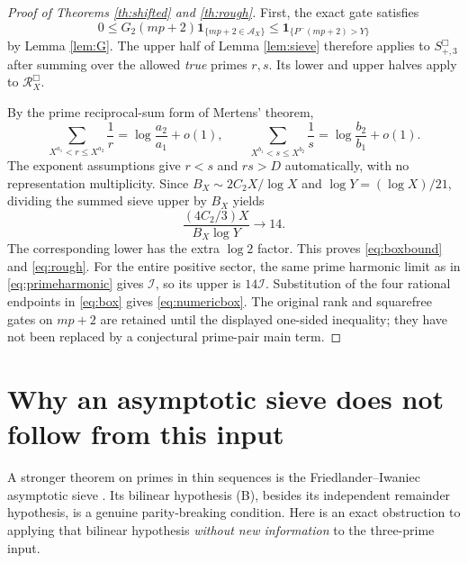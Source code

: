 \documentclass[11pt]{article}
\newcommand{\one}{\mathbf 1}
\newcommand{\aset}{\mathcal A}
\newcommand{\phimin}{P^-}
\begin{document}
\begin{proof}[Proof of Theorems \ref{th:shifted} and \ref{th:rough}]
First, the exact gate satisfies
\[
 0\le G_2(mp+2)\one_{\{mp+2\in\aset_X\}}
 \le\one_{\{\phimin(mp+2)>Y\}}
\]
by Lemma \ref{lem:G}.  The upper half of Lemma \ref{lem:sieve}
therefore applies to $S_{+,3}^{\Box}$ after summing over the
allowed \emph{true} primes $r,s$.  Its lower and upper halves apply
to $\mathcal R_X^{\Box}$.

By the prime reciprocal-sum form of Mertens' theorem,
\[
 \sum_{X^{a_1}<r\le X^{a_2}}\frac1r
  =\log\frac{a_2}{a_1}+o(1),\qquad
 \sum_{X^{b_1}<s\le X^{b_2}}\frac1s
  =\log\frac{b_2}{b_1}+o(1).
\]
The exponent assumptions give $r<s$ and $rs>D$ automatically,
with no representation multiplicity.  Since
$B_X\sim2C_2X/\log X$ and $\log Y=(\log X)/21$,
dividing the summed sieve upper by $B_X$ yields
\[
 \frac{(4C_2/3)X}{B_X\log Y}
       \longrightarrow14.
\]
The corresponding lower has the extra $\log2$ factor.
This proves \eqref{eq:boxbound} and \eqref{eq:rough}.
For the entire positive sector, the same prime harmonic limit as
in \eqref{eq:primeharmonic} gives $\mathcal I$, so its upper is
$14\mathcal I$.  Substitution of the four rational endpoints in
\eqref{eq:box} gives \eqref{eq:numericbox}.
The original rank and squarefree gates on $mp+2$ are retained
until the displayed one-sided inequality; they have not been
replaced by a conjectural prime-pair main term.
\end{proof}

\section{Why an asymptotic sieve does not follow from this input}

A stronger theorem on primes in thin sequences is the
Friedlander--Iwaniec asymptotic sieve \cite{FI1998}.  Its
bilinear hypothesis (B), besides its independent remainder
hypothesis, is a genuine parity-breaking condition.
Here is an exact obstruction to applying that bilinear hypothesis
\emph{without new information} to the three-prime input.
\end{document}
